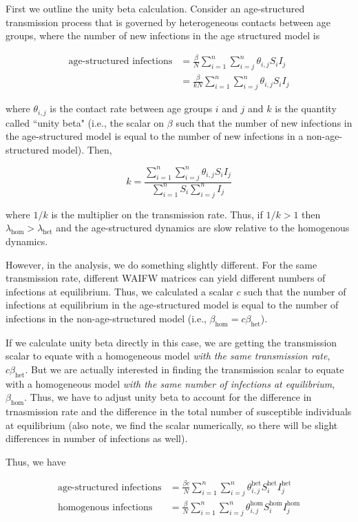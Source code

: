 \documentclass[12pt]{article}
\begin{document}
First we outline the unity beta calculation. Consider an age-structured transmission process that is governed by heterogeneous contacts between age groups, where the number of new infections in the age structured model is

\begin{align}
    \text{age-structured infections} &=  \frac{\beta}{N}\sum_{i=1}^{n}\sum_{i=j}^{n} \theta_{i,j} S_i I_j \\
    &= \frac{\beta}{kN}\sum_{i=1}^{n}\sum_{i=j}^{n} \theta_{i,j} S_i I_j 
\end{align}

\noindent
where $\theta_{i,j}$ is the contact rate between age groups $i$ and $j$ and $k$ is the quantity called ``unity beta" (i.e., the scalar on $\beta$ such that the number of new infections in the age-structured model is equal to the number of new infections in a non-age-structured model). Then, 

$$
k = \frac{\sum_{i=1}^{n}\sum_{i=j}^{n} \theta_{i,j} S_i I_j}{\sum_{i=1}^{n}S_i\sum_{i=j}^{n}I_j}
$$

\noindent
where $1/k$ is the multiplier on the transmission rate. Thus, if $1/k > 1$ then $\lambda_{\text{hom}} > \lambda_{\text{het}}$ and the age-structured dynamics are slow relative to the homogenous dynamics.

However, in the analysis, we do something slightly different. For the same transmission rate, different WAIFW matrices can yield different numbers of infections at equilibrium. Thus, we calculated a scalar $c$ such that the number of infections at equilibrium in the age-structured model is equal to the number of infections in the non-age-structured model (i.e., $\beta_{\text{hom}} = c\beta_{\text{het}}$). 

If we calculate unity beta directly in this case, we are getting the transmission scalar to equate with a homogeneous model \textit{with the same transmission rate}, $c\beta_{\text{het}}$. But we are actually interested in finding the transmission scalar to equate with a homogeneous model \textit{with the same number of infections at equilibrium}, $\beta_{\text{hom}}$. Thus, we have to adjust unity beta to account for the difference in trnasmission rate and the difference in the total number of susceptible individuals at equilibrium (also note, we find the scalar numerically, so there will be slight differences in number of infections as well). 

Thus, we have

\begin{align}
    \text{age-structured infections} &=  \frac{\beta c}{N}\sum_{i=1}^{n}\sum_{i=j}^{n} \theta^{\text{het}}_{i,j} S^{\text{het}}_i I^{\text{het}}_j \\
    \text{homogenous infections} &=  \frac{\beta}{N}\sum_{i=1}^{n}\sum_{i=j}^{n} \theta^{\text{hom}}_{i,j} S^{\text{hom}}_i I^{\text{hom}}_j
\end{align}
\end{document}
